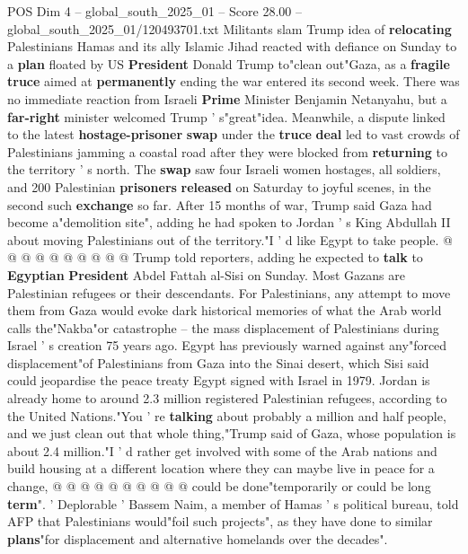 \begin{textsample}{POS Dim 4 – global\_south\_2025\_01 – Score 28.00 – global\_south\_2025\_01/120493701.txt}  \label{ex:f4_pos_004}
Militants slam Trump idea of \textbf{relocating} Palestinians Hamas and its ally Islamic Jihad reacted with defiance on Sunday to a \textbf{plan} floated by US \textbf{President} Donald Trump to"clean out"Gaza, as a \textbf{fragile} \textbf{truce} aimed at \textbf{permanently} ending the war entered its second week.
There was no immediate reaction from Israeli \textbf{Prime} Minister Benjamin Netanyahu, but a \textbf{far-right} minister welcomed Trump ' s"great"idea.
Meanwhile, a dispute linked to the latest \textbf{hostage-prisoner} \textbf{swap} under the \textbf{truce} \textbf{deal} led to vast crowds of Palestinians jamming a coastal road after they were blocked from \textbf{returning} to the territory ' s north.
The \textbf{swap} saw four Israeli women hostages, all soldiers, and 200 Palestinian \textbf{prisoners} \textbf{released} on Saturday to joyful scenes, in the second such \textbf{exchange} so far.
After 15 months of war, Trump said Gaza had become a"demolition site", adding he had spoken to Jordan ' s King Abdullah II about moving Palestinians out of the territory."I ' d like Egypt to take people. @ @ @ @ @ @ @ @ @ @ Trump told reporters, adding he expected to \textbf{talk} to \textbf{Egyptian} \textbf{President} Abdel Fattah al-Sisi on Sunday.
Most Gazans are Palestinian refugees or their descendants.
For Palestinians, any attempt to move them from Gaza would evoke dark historical memories of what the Arab world calls the"Nakba"or catastrophe -- the mass displacement of Palestinians during Israel ' s creation 75 years ago.
Egypt has previously warned against any"forced displacement"of Palestinians from Gaza into the Sinai desert, which Sisi said could jeopardise the peace treaty Egypt signed with Israel in 1979.
Jordan is already home to around 2.3 million registered Palestinian refugees, according to the United Nations."You ' re \textbf{talking} about probably a million and half people, and we just clean out that whole thing,"Trump said of Gaza, whose population is about 2.4 million."I ' d rather get involved with some of the Arab nations and build housing at a different location where they can maybe live in peace for a change, @ @ @ @ @ @ @ @ @ @ could be done"temporarily or could be long \textbf{term}". ' Deplorable ' Bassem Naim, a member of Hamas ' s political bureau, told AFP that Palestinians would"foil such projects", as they have done to similar \textbf{plans}"for displacement and alternative homelands over the decades".

\end{textsample}
